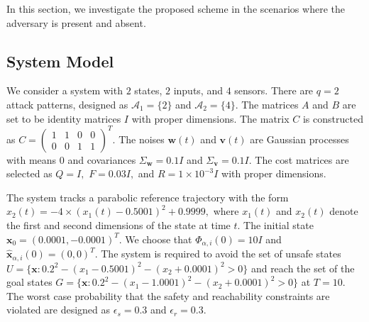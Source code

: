 \documentclass[journal]{IEEEtran}
\begin{document}
In this section, we investigate the proposed scheme in the scenarios where the adversary is present and absent. 


\subsection{System Model}
\label{subsec:system-model}
We consider a system with $2$ states, $2$ inputs, and $4$ sensors. There are $q = 2$ attack patterns, designed as $\mathcal{A}_1 = \{2\}$ and $\mathcal{A}_2 = \{4\}.$ The matrices $A$ and $B$ are set to be identity matrices $I$ with proper dimensions. The matrix $C$ is constructed as 
$C = {\begin{pmatrix}1&1&0&0\\0&0&1&1\end{pmatrix}}^T.$
The noises $\mathbf{w}(t)$ and $\mathbf{v}(t)$ are Gaussian processes with means $0$ and covariances $\Sigma_{\mathbf{w}} = 0.1I$ and $\Sigma_{\mathbf{v}} = 0.1I.$ 
The cost matrices are selected as $Q = I,$ $F = 0.03 I,$ and $R = 1\times10^{-3}I$ with proper dimensions. 

The system tracks a parabolic reference trajectory with the form 
$x_2(t) = -4\times(x_1(t) - 0.5001)^2 + 0.9999,$
where $x_1(t)$ and $x_2(t)$ denote the first and second dimensions of the state at time $t.$  The initial state $\mathbf{x}_0 = (0.0001, -0.0001)^T$. We choose that $\Phi_{\alpha,i}(0) = 10I$ and $\hat{\mathbf{x}}_{\alpha,i}(0) = (0, 0)^T$. The system is required to avoid the set of unsafe states $U = \{\mathbf{x}: 0.2^2 - (x_1 - 0.5001)^2 - (x_2 + 0.0001)^2 > 0\}$ and reach the set of the goal states $G = \{\mathbf{x}: 0.2^2 - (x_1 - 1.0001)^2 - (x_2 + 0.0001)^2 > 0\}$ at $T = 10.$ The worst case probability that the safety and reachability constraints are violated are designed as $\epsilon_s = 0.3$ and $\epsilon_r = 0.3.$
\end{document}
